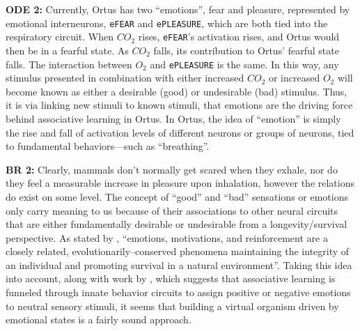 \documentclass[letterpaper]{article}
\begin{document}
\textbf{ODE 2:} Currently, Ortus has two ``emotions'', fear and pleasure, represented by emotional interneurons, \texttt{eFEAR} and \texttt{ePLEASURE}, which are both tied into the respiratory circuit. When $CO_2$ rises, \texttt{eFEAR}'s activation rises, and Ortus would then be in a fearful state. As $CO_2$ falls, its contribution to Ortus' fearful state falls. The interaction between $O_2$ and \texttt{ePLEASURE} is the same. In this way, any stimulus presented in combination with either increased $CO_2$ or increased $O_2$ will become known as either a desirable (good) or undesirable (bad) stimulus. Thus, it is via linking new stimuli to known stimuli, that emotions are the driving force behind associative learning in Ortus. In Ortus, the idea of ``emotion'' is simply the rise and fall of activation levels of different neurons or groups of neurons, tied to fundamental behaviors---such as ``breathing''.

\textbf{BR 2:} Clearly, mammals don't normally get scared when they exhale, nor do they feel a measurable increase in pleasure upon inhalation, however the relations do exist on some level. The concept of ``good'' and ``bad'' sensations or emotions only carry meaning to us because of their associations to other neural circuits that are either fundamentally desirable or undesirable from a longevity/survival perspective.
As stated by \citet{Verma2015}, ``emotions, motivations, and reinforcement are a closely related, evolutionarily--conserved phenomena maintaining the integrity of an individual and promoting survival in a natural environment''. Taking this idea into account, along with work by \citet{Gore2015}, which suggests that associative learning is funneled through innate behavior circuits to assign positive or negative emotions to neutral sensory stimuli, it seems that building a virtual organism driven by emotional states is a fairly sound approach. 
\end{document}
